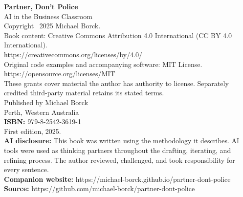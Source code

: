 \thispagestyle{empty}
\vspace*{\fill}

\begin{flushleft}
\textbf{Partner, Don't Police}\\
AI in the Business Classroom\\[1.5em]
Copyright \textcopyright\ 2025 Michael Borck.\\[1em]
Book content: Creative Commons Attribution 4.0 International (CC BY 4.0 International).\\
https://creativecommons.org/licenses/by/4.0/\\[0.5em]
Original code examples and accompanying software: MIT License.\\
https://opensource.org/licenses/MIT\\[0.5em]
These grants cover material the author has authority to license. Separately credited third-party material retains its stated terms.\\[1em]
Published by Michael Borck\\
Perth, Western Australia\\[1em]
\textbf{ISBN:} 979-8-2542-3619-1\\[1em]
First edition, 2025.\\[1em]
\textbf{AI disclosure:} This book was written using the methodology it describes. AI tools were used as thinking partners throughout the drafting, iterating, and refining process. The author reviewed, challenged, and took responsibility for every sentence.\\[1em]
\textbf{Companion website:} https://michael-borck.github.io/partner-dont-police\\
\textbf{Source:} https://github.com/michael-borck/partner-dont-police
\end{flushleft}

\vspace*{\fill}
\clearpage
